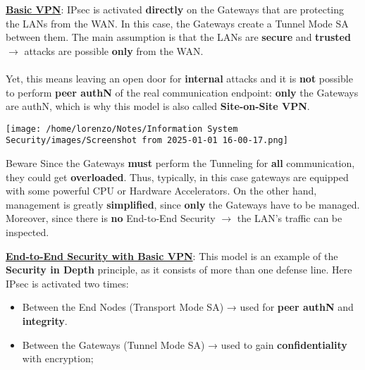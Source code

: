 \begin{itemize}
    \begin{minipage}{0.6\textwidth}
    \item \underline{\textbf{Basic VPN}}: IPsec is activated \textbf{directly} on the Gateways that are protecting the LANs from the WAN. In
    this case, the Gateways create a Tunnel Mode SA between them. The main assumption is
    that the LANs are \textbf{secure} and \textbf{trusted} \(\rightarrow \) attacks are possible \textbf{only} from the WAN.
    \\     \\    
    Yet, this means leaving an open door for \textbf{internal} attacks and it is \textbf{not} possible to perform
\textbf{peer authN} of the real communication endpoint: \textbf{only} the Gateways are authN, which is why
this model is also called \textbf{Site-on-Site VPN}. 
    \end{minipage} 
    \hspace{0.2cm}
    \begin{minipage}{0.4\textwidth}
        \centering
        \texttt{[image: /home/lorenzo/Notes/Information System Security/images/Screenshot from 2025-01-01 16-00-17.png]}
    \end{minipage}
\begin{quotebox-red}{Beware}
    Since the Gateways \textbf{must} perform the Tunneling for \textbf{all} communication, they could
    get \textbf{overloaded}. Thus, typically, in this case gateways are equipped with some powerful CPU
    or Hardware Accelerators. On the other hand, management is greatly \textbf{simplified}, since \textbf{only}
    the Gateways have to be managed. Moreover, since there is \textbf{no} End-to-End Security \(\rightarrow \) the
    LAN’s traffic can be inspected.
\end{quotebox-red}
\newpage
\begin{minipage}{0.6\textwidth}
\item \underline{\textbf{End-to-End Security with Basic VPN}}: This model is an example of the \textbf{Security in Depth} principle, as it consists of more than one
defense line. Here IPsec is activated two times:
\begin{itemize}
    \item Between the End Nodes (Transport Mode SA) → used for \textbf{peer authN} and \textbf{integrity}.
    \item  Between the Gateways (Tunnel Mode SA) → used to gain \textbf{confidentiality} with encryption;

\end{itemize}
\end{minipage}
\end{itemize}
